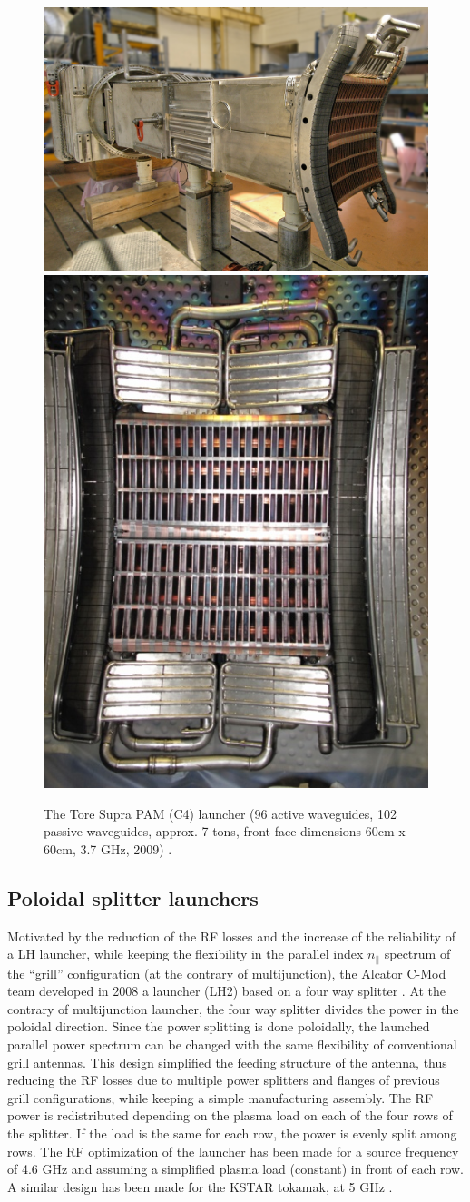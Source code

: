 \begin{figure}
\centering
\includegraphics[width=0.6\linewidth]{Figures/LHCD/dsc_6078_dxo_2}
\includegraphics[width=0.3\linewidth]{Figures/LHCD/ToreSupra_C4}
\caption{The Tore Supra PAM (C4) launcher (96 active waveguides, 102 passive waveguides, approx. 7 tons, front face dimensions 60cm x 60cm, 3.7 GHz, 2009) \parencite{Guilhem2009, Guilhem2011}.}
\label{fig:toresupraC4}
\end{figure}


\subsection{Poloidal splitter launchers}
Motivated by the reduction of the RF losses and the increase of the reliability of a LH launcher, while keeping the flexibility in the parallel index $n_{\parallel}$ spectrum of the “grill” configuration (at the contrary of multijunction), the Alcator C-Mod team developed in 2008 a launcher (LH2) based on a four way splitter \parencite{Koert2008a}. At the contrary of multijunction launcher, the four way splitter divides the power in the poloidal direction. Since the power splitting is done poloidally, the launched parallel power spectrum can be changed with the same flexibility of conventional grill antennas. This design simplified the feeding structure of the antenna, thus reducing the RF losses due to multiple power splitters and flanges of previous grill configurations, while keeping a simple manufacturing assembly. The RF power is redistributed depending on the plasma load on each of the four rows of the splitter. If the load is the same for each row, the power is evenly split among rows. The RF optimization of the launcher has been made for a source frequency of 4.6 GHz and assuming a simplified plasma load (constant) in front of each row. A similar design has been made for the KSTAR tokamak, at 5 GHz \parencite{Kim2012}. 


